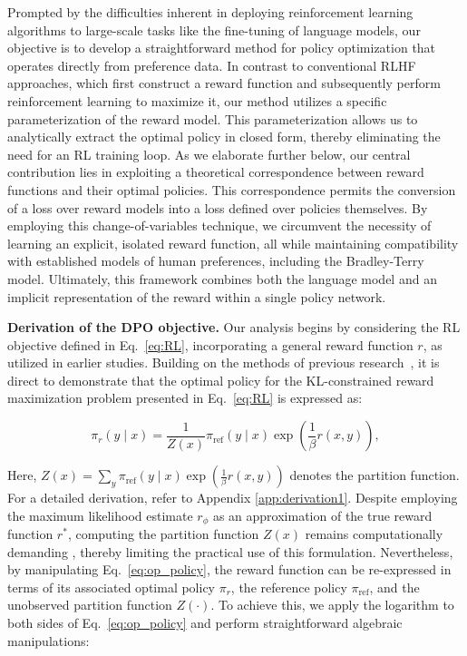Prompted by the difficulties inherent in deploying reinforcement learning algorithms to large-scale tasks like the fine-tuning of language models, our objective is to develop a straightforward method for policy optimization that operates directly from preference data. In contrast to conventional RLHF approaches, which first construct a reward function and subsequently perform reinforcement learning to maximize it, our method utilizes a specific parameterization of the reward model. This parameterization allows us to analytically extract the optimal policy in closed form, thereby eliminating the need for an RL training loop. As we elaborate further below, our central contribution lies in exploiting a theoretical correspondence between reward functions and their optimal policies. This correspondence permits the conversion of a loss over reward models into a loss defined over policies themselves. By employing this change-of-variables technique, we circumvent the necessity of learning an explicit, isolated reward function, all while maintaining compatibility with established models of human preferences, including the Bradley-Terry model. Ultimately, this framework combines both the language model and an implicit representation of the reward within a single policy network.

\textbf{Derivation of the DPO objective.} Our analysis begins by considering the RL objective defined in Eq.~\ref{eq:RL}, incorporating a general reward function $r$, as utilized in earlier studies. Building on the methods of previous research~\citep{peters2007reinforcement, peng2019advantage, korbak2022reinforcement, go2023aligning}, it is direct to demonstrate that the optimal policy for the KL-constrained reward maximization problem presented in Eq.~\ref{eq:RL} is expressed as:

\begin{equation}\label{eq:op_policy}
    \pi_r(y\mid x) = \frac{1}{Z(x)}\pi_\text{ref}(y\mid x)\exp\left(\frac{1}{\beta}r(x, y)\right),
\end{equation}

Here, $Z(x) =\sum_{y}\pi_\text{ref}(y\mid x)\exp\left(\frac{1}{\beta}r(x, y)\right)$ denotes the partition function. For a detailed derivation, refer to Appendix \ref{app:derivation1}. Despite employing the maximum likelihood estimate $r_{\phi}$ as an approximation of the true reward function $r^*$, computing the partition function $Z(x)$ remains computationally demanding \citep{korbak2022reinforcement, go2023aligning}, thereby limiting the practical use of this formulation. Nevertheless, by manipulating Eq.~\ref{eq:op_policy}, the reward function can be re-expressed in terms of its associated optimal policy $\pi_r$, the reference policy $\pi_\text{ref}$, and the unobserved partition function $Z(\cdot)$. To achieve this, we apply the logarithm to both sides of Eq.~\ref{eq:op_policy} and perform straightforward algebraic manipulations:

